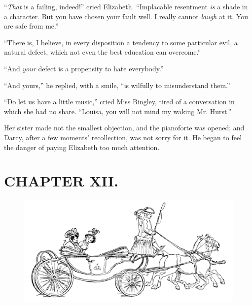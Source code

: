 ``\textit{That} is a failing, indeed!'' cried Elizabeth. ``Implacable resentment \textit{is} a shade in a character. But you have chosen your fault well. I really cannot \textit{laugh} at it. You are safe from me.''

``There is, I believe, in every disposition a tendency to some particular evil, a natural defect, which not even the best education can overcome.''

``And \textit{your} defect is a propensity to hate everybody.''

``And yours,'' he replied, with a smile, ``is wilfully to misunderstand them.''

``Do let us have a little music,'' cried Miss Bingley, tired of a conversation in which she had no share. ``Louisa, you will not mind my waking Mr. Hurst.''

Her sister made not the smallest objection, and the pianoforte was opened; and Darcy, after a few moments' recollection, was not sorry for it. He began to feel the danger of paying Elizabeth too much attention.


\chapter{CHAPTER XII.}

\begin{figure}[htbp]
    \centering
    \includegraphics[width=\textwidth]{illustrations/i_104_a.jpg}
\end{figure}


